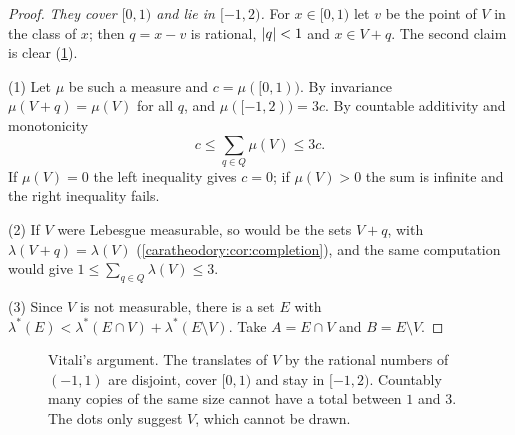 \begin{notechapter}
\begin{proof}
\emph{They cover $[0, 1)$ and lie in $[-1, 2)$.} For $x\in[0, 1)$ let
$v$ be the point of $V$ in the class of $x$; then $q = x - v$ is
rational, $\left|q\right| < 1$ and $x\in V + q$. The second claim is clear
(\cref{caratheodory:fig:vitali}).

(1) Let $\mu$ be such a measure and $c = \mu([0, 1))$. By invariance
$\mu(V + q) = \mu(V)$ for all $q$, and $\mu([-1, 2)) = 3c$. By
countable additivity and monotonicity
\[
  c\leq\sum_{q\in Q}\mu(V)\leq3c .
\]
If $\mu(V) = 0$ the left inequality gives $c = 0$; if $\mu(V) > 0$ the
sum is infinite and the right inequality fails.

(2) If $V$ were Lebesgue measurable, so would be the sets $V + q$,
with $\lambda(V + q) = \lambda(V)$
(\cref{caratheodory:cor:completion}), and the same computation would
give $1\leq\sum_{q\in Q}\lambda(V)\leq3$.

(3) Since $V$ is not measurable, there is a set $E$ with
$\lambda^*(E) < \lambda^*(E\cap V) + \lambda^*(E\setminus V)$. Take
$A = E\cap V$ and $B = E\setminus V$.
\end{proof}

\begin{figure}[ht]
\centering
{}
\caption{Vitali's argument. The translates of $V$ by the rational
numbers of $(-1, 1)$ are disjoint, cover $[0, 1)$ and stay in
$[-1, 2)$. Countably many copies of the same size cannot have a total
between $1$ and $3$. The dots only suggest $V$, which cannot be drawn.}
\label{caratheodory:fig:vitali}
\end{figure}


\end{notechapter}

